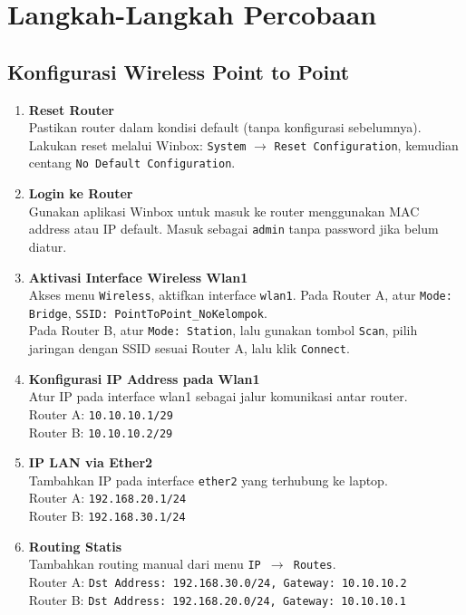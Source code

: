 \section{Langkah-Langkah Percobaan}
 
\subsection{Konfigurasi Wireless Point to Point}
\begin{enumerate}
    \item \textbf{Reset Router} \\
    Pastikan router dalam kondisi default (tanpa konfigurasi sebelumnya). Lakukan reset melalui Winbox: \texttt{System} $\rightarrow$ \texttt{Reset Configuration}, kemudian centang \texttt{No Default Configuration}.
    
    \item \textbf{Login ke Router} \\
    Gunakan aplikasi Winbox untuk masuk ke router menggunakan MAC address atau IP default. Masuk sebagai \texttt{admin} tanpa password jika belum diatur.

    \item \textbf{Aktivasi Interface Wireless Wlan1} \\
    Akses menu \texttt{Wireless}, aktifkan interface \texttt{wlan1}. Pada Router A, atur \texttt{Mode: Bridge}, \texttt{SSID: PointToPoint\_NoKelompok}. \\
    Pada Router B, atur \texttt{Mode: Station}, lalu gunakan tombol \texttt{Scan}, pilih jaringan dengan SSID sesuai Router A, lalu klik \texttt{Connect}.

    \item \textbf{Konfigurasi IP Address pada Wlan1} \\
    Atur IP pada interface wlan1 sebagai jalur komunikasi antar router. \\
    Router A: \texttt{10.10.10.1/29} \\
    Router B: \texttt{10.10.10.2/29}

    \item \textbf{IP LAN via Ether2} \\
    Tambahkan IP pada interface \texttt{ether2} yang terhubung ke laptop. \\
    Router A: \texttt{192.168.20.1/24} \\
    Router B: \texttt{192.168.30.1/24}

    \item \textbf{Routing Statis} \\
    Tambahkan routing manual dari menu \texttt{IP $\rightarrow$ Routes}. \\
    Router A: \texttt{Dst Address: 192.168.30.0/24, Gateway: 10.10.10.2} \\
    Router B: \texttt{Dst Address: 192.168.20.0/24, Gateway: 10.10.10.1}


\end{enumerate}
